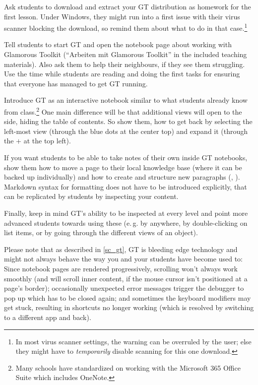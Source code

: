 \begin{instructions}
\item Ask students to download and extract your GT distribution as homework for the first lesson. Under Windows, they might run into a first issue with their virus scanner blocking the download, so remind them about what to do in that case.\footnote{In most virus scanner settings, the warning can be overruled by the user; else they might have to \emph{temporarily} disable scanning for this one download.}
\item Tell students to start GT and open the notebook page about working with Glamorous Toolkit (``Arbeiten mit Glamorous Toolkit'' in the included teaching materials). Also ask them to help their neighbours, if they see them struggling. Use the time while students are reading and doing the first tasks for ensuring that everyone has managed to get GT running.
\item Introduce GT as an interactive notebook similar to what students already know from class.\footnote{Many schools have standardized on working with the Microsoft 365 Office Suite which includes OneNote.} One main difference will be that additional views will open to the side, hiding the table of contents. So show them, how to get back by selecting the left-most view (through the blue dots at the center top) and expand it (through the $+$ at the top left).
\item If you want students to be able to take notes of their own inside GT notebooks, show them how to move a page to their local knowledge base (where it can be backed up individually) and how to create and structure new paragraphs (, ). Markdown syntax for formatting does not have to be introduced explicitly, that can be replicated by students by inspecting your content.
\item Finally, keep in mind GT's ability to be inspected at every level and point more advanced students towards using these (e.\,g. by  anywhere, by double-clicking on list items, or by going through the different views of an object).
\end{instructions}

Please note that as described in \ref{sc_gt}, GT is bleeding edge technology and might not always behave the way you and your students have become used to: Since notebook pages are rendered progressively, scrolling won't always work smoothly (and will scroll inner content, if the mouse cursor isn't positioned at a page's border); occasionally unexpected error messages trigger the debugger to pop up which has to be closed again; and sometimes the keyboard modifiers may get stuck, resulting in shortcuts no longer working (which is resolved by switching to a different app and back).



